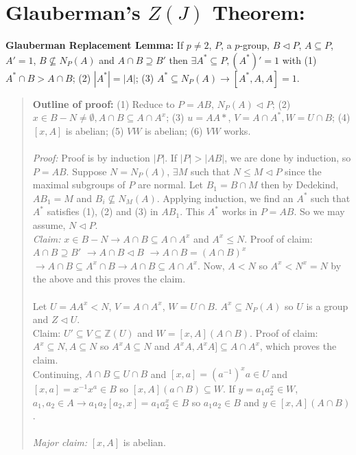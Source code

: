 \section{Glauberman's $Z(J)$ Theorem:}
{\bf Glauberman Replacement Lemma:}  If $p \ne 2$, $P$, a $p$-group, $B \lhd P$,
$A \subseteq P$, $A'=1$, $B \nsubseteq N_P(A)$ and $A \cap B \supseteq B'$ then
$\exists A^* \subseteq P, (A^*)'=1$ with
(1) $A^* \cap B > A \cap B$;
(2) $|A^*|= |A|$;
(3) $A^* \subseteq N_P(A) \rightarrow [A^*, A, A]=1$.
\begin{quote}
{\bf Outline of proof:} 
(1) Reduce to $P=AB$, $N_P(A) \lhd P$; 
(2) $x \in B-N \ne \emptyset, A \cap B \subseteq A \cap A^x$;
(3) $u=A A*$, $V=A \cap A^*, W=U \cap B$;
(4) $[x, A]$ is abelian;
(5) $VW$ is abelian;
(6) $VW$ works.
\\
\\
\emph{Proof:}
Proof is by induction $|P|$.  If $|P|>|AB|$, we are done by induction,
so $P=AB$.  Suppose $N=N_P(A)$, $\exists M$ such that $N \le M \lhd P$ since
the maximal subgroups of $P$ are normal.  Let $B_1= B \cap M$ then by
Dedekind, $A B_1= M$ and $B_i \nsubseteq N_M(A)$.  Applying induction,
we find an $A^*$ such that $A^*$ satisfies (1), (2) and (3) in $A B_1$.  This
$A^*$ works in $P=AB$.  So we may assume, $N \lhd P$.\\
\emph{Claim:} $x \in B-N \rightarrow A \cap B \subseteq A \cap A^x$ and
$A^x \le N$.  Proof of claim:
$A \cap B \supseteq B'$ $\rightarrow A \cap B \lhd B$ $ \rightarrow A \cap B= (A \cap B)^x$
$\rightarrow A \cap B \subseteq A^x \cap B \rightarrow A \cap B \subseteq A \cap A^x$.
Now, $A<N$ so $A^x < N^x=N$ by the above and this proves the claim.
\\
\\
Let $U=A A^x<N$, $V=A \cap A^x$, $W= U \cap B$.  $A^x \subseteq  N_P(A)$ so $U$ is a
group and $Z \lhd U$.\\
Claim:  $U' \subseteq V \subseteq {\mathbb Z}(U)$ and $W= [x,A](A \cap B)$.  Proof of claim:
$A^x \subseteq N, A \subseteq N$ so $A^xA \subseteq N$ and $A^xA, A^xA] \subseteq A \cap A^x$,
which proves the claim.\\
Continuing, $A \cap B \subseteq U \cap B$ and $[x,a]= (a^{-1})^xa \in U$ and 
$[x,a]= x^{-1} x^a \in B$ so $[x,A](a \cap B) \subseteq W$.    If $y=a_1 a_2^x \in W$,
$a_1 , a_2 \in A \rightarrow a_1 a_2 [a_2,x]= a_1 a_2^x \in B$ so
$a_1 a_2 \in B$ and $y \in [x,A](A \cap B)$.
\\
\\
\emph{Major claim:} $[x, A]$ is abelian.
\\

\end{quote}
